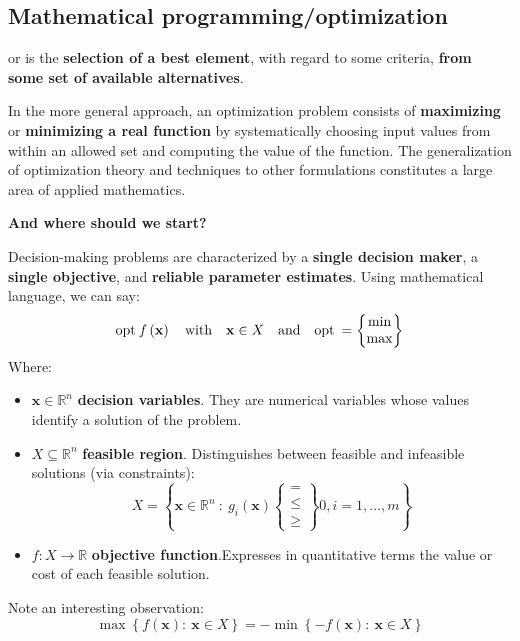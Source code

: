 \subsection{Mathematical programming/optimization}

 or  is the \textbf{selection of a best element}, with regard to some criteria, \textbf{from some set of available alternatives}.

In the more general approach, an optimization problem consists of \textbf{maximizing} or \textbf{minimizing a real function} by systematically choosing input values from within an allowed set and computing the value of the function. The generalization of optimization theory and techniques to other formulations constitutes a large area of applied mathematics.

\highspace
\begin{flushleft}
    \textcolor{Green3}{ \textbf{And where should we start?}}
\end{flushleft}
Decision-making problems are characterized by a \textbf{single decision maker}, a \textbf{single objective}, and \textbf{reliable parameter estimates}. Using mathematical language, we can say:
\begin{equation*}
    \mathrm{opt} \: f\left(\mathbf{x}\right) \hspace{1em} \text{with} \hspace{1em} \mathbf{x} \in X \hspace{1em} \text{and} \hspace{1em} \mathrm{opt} \: = \begin{Bmatrix}
        \min \\ \max
    \end{Bmatrix}
\end{equation*}
Where:
\begin{itemize}
    \item $\mathbf{x} \in \mathbb{R}^{n}$ \textbf{decision variables}. They are numerical variables whose values identify a solution of the problem.

    \item $X \subseteq \mathbb{R}^{n}$ \textbf{feasible region}. Distinguishes between feasible and infeasible solutions (via constraints):
    \begin{equation*}
        X = \left\{\mathbf{x} \in \mathbb{R}^{n} \: : \: g_{i}\left(\mathbf{x}\right) \begin{Bmatrix}
        = \\ \le \\ \ge
        \end{Bmatrix} 0, i = 1, \dots, m\right\}
    \end{equation*}

    \item $f: X \rightarrow \mathbb{R}$ \textbf{objective function}.Expresses in quantitative terms the value or cost of each feasible solution.
\end{itemize}
Note an interesting observation:
\begin{equation*}
    \max\left\{f\left(\mathbf{x}\right): \: \mathbf{x} \in X\right\} = -\min\left\{-f\left(\mathbf{x}\right): \: \mathbf{x} \in X\right\}
\end{equation*} 